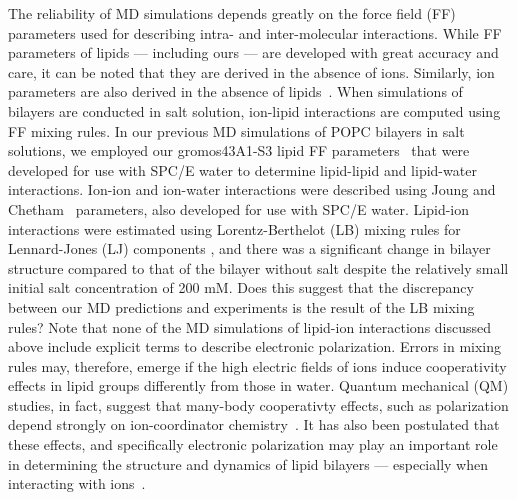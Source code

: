 The reliability of MD simulations depends greatly on the force field (FF) parameters 
used for describing intra- and inter-molecular interactions. 
While FF parameters of lipids --- including ours --- are developed with great accuracy and care, 
it can be noted that they are derived in the absence of ions. 
Similarly, ion parameters are also derived in the absence of lipids~\cite{joung:2008}. 
When simulations of bilayers are conducted in salt solution, 
ion-lipid interactions are computed using FF mixing rules. 
In our previous MD simulations of POPC bilayers in salt solutions, 
we employed our gromos43A1-S3 lipid FF parameters~\cite{chiu:2009} 
that were developed for use with SPC/E water to determine lipid-lipid and lipid-water interactions. 
Ion-ion and ion-water interactions were described using Joung and Chetham~\cite{joung:2008} parameters, 
also developed for use with SPC/E water. 
Lipid-ion interactions were estimated using Lorentz-Berthelot (LB) 
mixing rules for Lennard-Jones (LJ) components
, and there was a significant change in bilayer 
structure compared to that of the bilayer without salt despite the relatively small initial salt concentration of 200 mM.
Does this suggest that the discrepancy between our MD predictions and experiments 
is the result of the LB mixing rules?  
Note that none of the MD simulations of lipid-ion interactions discussed above
include explicit terms to describe electronic polarization. 
Errors in mixing rules may, therefore, 
emerge if the high electric fields of ions induce 
cooperativity effects in lipid groups 
differently from those in water. 
Quantum mechanical (QM) studies, in fact, suggest that many-body 
cooperativty effects, such as polarization depend  
strongly on ion-coordinator chemistry~\cite{varma:2010,wineman:2019}. 
It has also been postulated that these effects, and specifically 
electronic 
polarization may play an
important role in determining the structure and dynamics of lipid
bilayers
--- especially when interacting with 
ions~\cite{vacha:2010,vorobyov:2010,melcr:2018,chen:2021,lee:2008:origin}.


